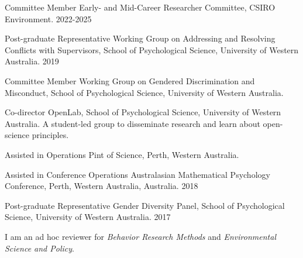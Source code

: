 \begin{minipage}{\textwidth}
\begin{cvhonors}
    

  \cvhonor
    {Committee Member} %
    {Early- and Mid-Career Researcher Committee, CSIRO Environment.} %
    {} %
    {2022-2025} %


  \cvhonor
    {Post-graduate Representative} %
    {Working Group on Addressing and Resolving Conflicts with Supervisors, School of Psychological Science, University of Western Australia.} %
    {} %
    {2019} %
    
    \cvhonor
    {Committee Member} %
    {Working Group on Gendered Discrimination and Misconduct, School of Psychological Science, University of Western Australia.} %
    {} %
    {} %
    
    \cvhonor
    {Co-director} %
    {OpenLab, School of Psychological Science, University of Western Australia.
    A student-led group to disseminate research and learn about open-science principles.} %
    {} %
    {} %
    
    \cvhonor
    {Assisted in Operations} %
    {Pint of Science, Perth, Western Australia.
    } %
    {} %
    {} %
    \end{cvhonors}
    \end{minipage}
    
    \begin{cvhonors}
    
    
    \cvhonor
    {Assisted in Conference Operations} %
    {Australasian Mathematical Psychology Conference, Perth, Western Australia, Australia.} %
    {} %
    {2018} %
      
    \cvhonor
    {Post-graduate Representative} %
    {Gender Diversity Panel, School of Psychological Science, University of Western Australia.} %
    {} %
    {2017} %


    
\end{cvhonors}
\begin{minipage}{\textwidth}

\begin{small} \color{black}
I am an ad hoc reviewer for \textit{Behavior Research Methods} and \textit{Environmental Science and Policy}.
\end{small}
\end{minipage}


